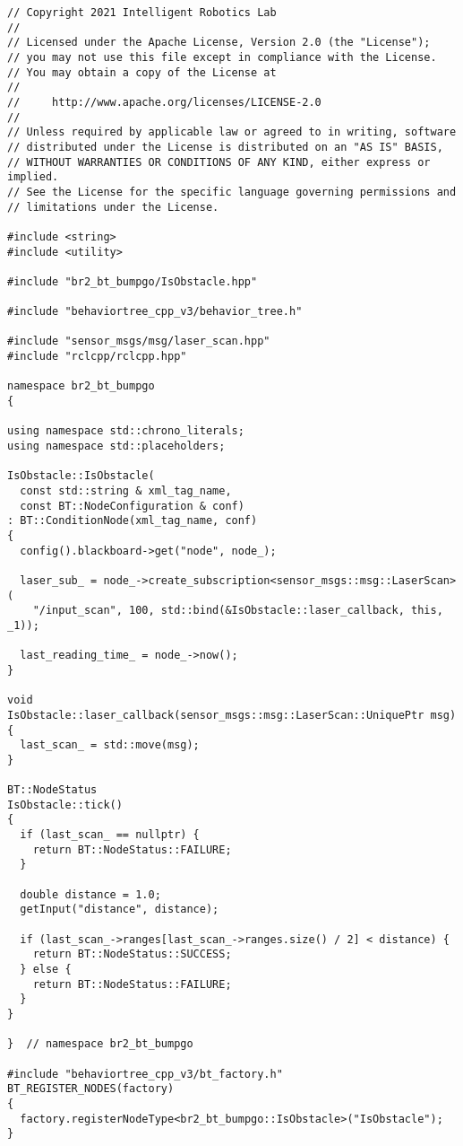  \footnotesize
\begin{tcolorbox}[sharp corners, colframe=gray!80, colback=LightGray, left=0pt, top=0pt, bottom=0pt, title=\texttt{br2\_bt\_bumpgo/src/br2\_bt\_bumpgo/IsObstacle.cpp}]
  \begin{verbatim}
// Copyright 2021 Intelligent Robotics Lab
//
// Licensed under the Apache License, Version 2.0 (the "License");
// you may not use this file except in compliance with the License.
// You may obtain a copy of the License at
//
//     http://www.apache.org/licenses/LICENSE-2.0
//
// Unless required by applicable law or agreed to in writing, software
// distributed under the License is distributed on an "AS IS" BASIS,
// WITHOUT WARRANTIES OR CONDITIONS OF ANY KIND, either express or implied.
// See the License for the specific language governing permissions and
// limitations under the License.

#include <string>
#include <utility>

#include "br2_bt_bumpgo/IsObstacle.hpp"

#include "behaviortree_cpp_v3/behavior_tree.h"

#include "sensor_msgs/msg/laser_scan.hpp"
#include "rclcpp/rclcpp.hpp"

namespace br2_bt_bumpgo
{

using namespace std::chrono_literals;
using namespace std::placeholders;

IsObstacle::IsObstacle(
  const std::string & xml_tag_name,
  const BT::NodeConfiguration & conf)
: BT::ConditionNode(xml_tag_name, conf)
{
  config().blackboard->get("node", node_);

  laser_sub_ = node_->create_subscription<sensor_msgs::msg::LaserScan>(
    "/input_scan", 100, std::bind(&IsObstacle::laser_callback, this, _1));

  last_reading_time_ = node_->now();
}

void
IsObstacle::laser_callback(sensor_msgs::msg::LaserScan::UniquePtr msg)
{
  last_scan_ = std::move(msg);
}

BT::NodeStatus
IsObstacle::tick()
{
  if (last_scan_ == nullptr) {
    return BT::NodeStatus::FAILURE;
  }

  double distance = 1.0;
  getInput("distance", distance);

  if (last_scan_->ranges[last_scan_->ranges.size() / 2] < distance) {
    return BT::NodeStatus::SUCCESS;
  } else {
    return BT::NodeStatus::FAILURE;
  }
}

}  // namespace br2_bt_bumpgo

#include "behaviortree_cpp_v3/bt_factory.h"
BT_REGISTER_NODES(factory)
{
  factory.registerNodeType<br2_bt_bumpgo::IsObstacle>("IsObstacle");
}
    \end{verbatim}
    \end{tcolorbox}
  \normalsize

